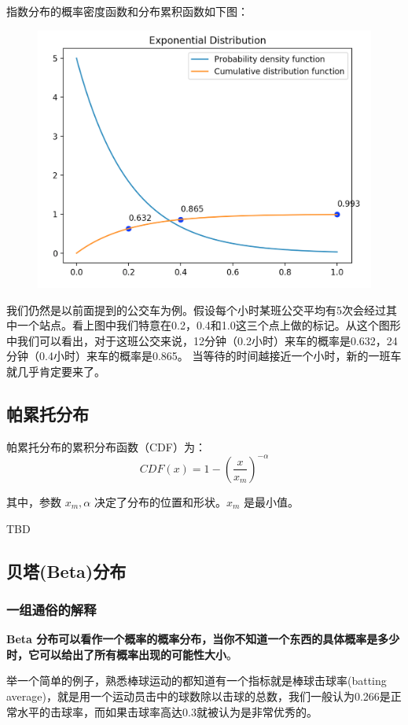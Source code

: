 \documentclass[12pt]{article}
\begin{document}
指数分布的概率密度函数和分布累积函数如下图：
\begin{figure}[H]
  \centering
  \includegraphics[width=.8\textwidth]{fig/expon_dist.png} 
\end{figure}

我们仍然是以前面提到的公交车为例。假设每个小时某班公交平均有5次会经过其中一个站点。看上图中我们特意在0.2，0.4和1.0这三个点上做的标记。从这个图形中我们可以看出，对于这班公交来说，12分钟（0.2小时）来车的概率是0.632，24分钟（0.4小时）来车的概率是0.865。 当等待的时间越接近一个小时，新的一班车就几乎肯定要来了。

\subsection{帕累托分布\cite{Think_Stats}}
帕累托分布的累积分布函数（CDF）为：
$$
CDF(x) = 1 - (\frac{x}{x_m})^{-\alpha}
$$

其中，参数 $x_m, \alpha$ 决定了分布的位置和形状。$x_m$ 是最小值。

TBD

\subsection{贝塔(Beta)分布}
\subsubsection{一组通俗的解释\cite{Commonly_Understand_Beta_Distribution}}
\textbf{Beta 分布可以看作一个概率的概率分布，当你不知道一个东西的具体概率是多少时，它可以给出了所有概率出现的可能性大小}。

举一个简单的例子，熟悉棒球运动的都知道有一个指标就是棒球击球率(batting average)，就是用一个运动员击中的球数除以击球的总数，我们一般认为0.266是正常水平的击球率，而如果击球率高达0.3就被认为是非常优秀的。
\end{document}
